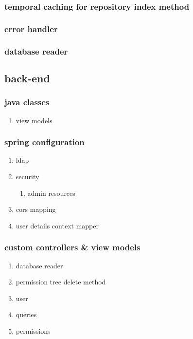 \documentclass[11pt]{article}
\begin{document}
\subsubsection{temporal caching for repository index method}
\label{sec:orge1a9274}
\subsubsection{error handler}
\label{sec:org70a1aac}
\subsubsection{database reader}
\label{sec:orgb9cb181}

\subsection{back-end}
\label{sec:org0924d39}
\subsubsection{java classes}
\label{sec:org6a172c0}
\begin{enumerate}
\item view models
\label{sec:orgeafa3a0}
\end{enumerate}
\subsubsection{spring configuration}
\label{sec:org70d44ab}
\begin{enumerate}
\item ldap
\label{sec:orgb8a6c82}
\item security
\label{sec:org29dc857}
\begin{enumerate}
\item admin resources
\label{sec:orgf3d5763}
\end{enumerate}
\item cors mapping
\label{sec:org56b9b3f}
\item user details context mapper
\label{sec:org2000dc8}
\end{enumerate}
\subsubsection{custom controllers \& view models}
\label{sec:orgece57a7}
\begin{enumerate}
\item database reader
\label{sec:org7d768f6}
\item permission tree delete method
\label{sec:orgc21706c}
\item user
\label{sec:org8461ec3}
\item queries
\label{sec:orgc0d3e5d}
\item permissions
\label{sec:org2e58eb2}
\end{enumerate}
\end{document}
